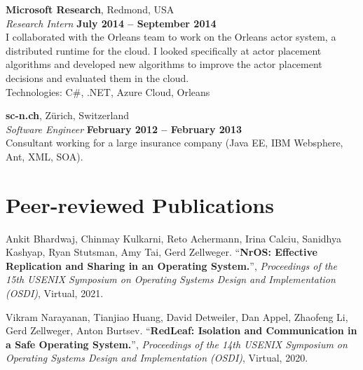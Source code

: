 \documentclass[margin,line]{cv/cv}
\begin{document}
\begin{resume}
    \textbf{Microsoft Research}, Redmond, USA \vspace{2mm}\\\vspace{1mm}%
    \textsl{Research Intern} \hfill \textbf{July 2014 -- September 2014}\\
    I collaborated with the Orleans team to work on the Orleans
    actor system, a distributed runtime for the cloud. I looked specifically at
    actor placement algorithms and developed new algorithms to improve the actor placement
    decisions and evaluated them in the cloud.\\ Technologies: C\#, .NET, Azure Cloud, Orleans

    \textbf{sc-n.ch}, Zürich, Switzerland \vspace{2mm}\\\vspace{1mm}%
    \textsl{Software Engineer} \hfill \textbf{February 2012 -- February 2013}\\
    Consultant working for a large insurance company (Java EE, IBM Websphere, Ant, XML, SOA).


    \pagebreak

    \section{\mysidestyle Peer-reviewed Publications}

     Ankit Bhardwaj, Chinmay Kulkarni, Reto Achermann, Irina Calciu, Sanidhya Kashyap, Ryan Stutsman, Amy Tai, Gerd Zellweger.
    ``\textbf{NrOS: Effective Replication and Sharing in an Operating System.}'', \textsl{Proceedings of the 15th USENIX Symposium on Operating Systems Design and Implementation (OSDI)}, Virtual, 2021.

    Vikram Narayanan, Tianjiao Huang, David Detweiler, Dan Appel, Zhaofeng Li, Gerd Zellweger, Anton Burtsev.
    ``\textbf{RedLeaf: Isolation and Communication in a Safe Operating System.}'', \textsl{Proceedings of the 14th USENIX Symposium on Operating Systems Design and Implementation (OSDI)}, Virtual, 2020.


\end{resume}
\end{document}
